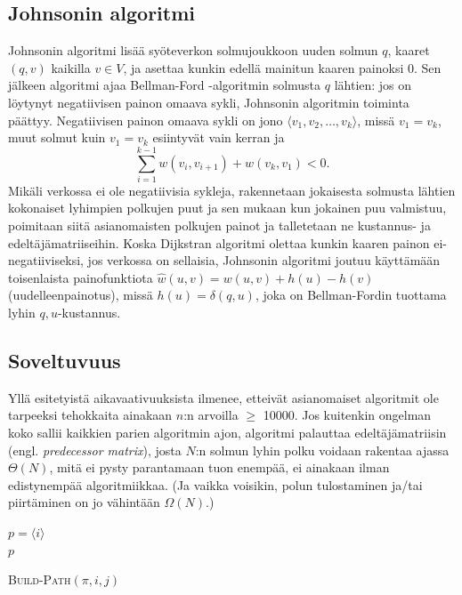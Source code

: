 \documentclass[finnish]{tktltiki2}
\newenvironment{finalgo}[1][htb]{
  \renewcommand{\algorithmcfname}{Algoritmi}
  \begin{algorithm}[#1]
}{\end{algorithm}}
\theoremstyle{definition}
\theoremstyle{remark}
\begin{document}
\subsection{Johnsonin algoritmi}
Johnsonin algoritmi lisää syöteverkon solmujoukkoon uuden solmun $q$, kaaret $(q, v)$ kaikilla $v \in V$, ja asettaa kunkin edellä mainitun kaaren painoksi 0. Sen jälkeen algoritmi ajaa Bellman-Ford -algoritmin solmusta $q$ lähtien: jos on löytynyt negatiivisen painon omaava sykli, Johnsonin algoritmin toiminta päättyy. 
Negatiivisen painon omaava sykli on jono $\langle v_1, v_2, \dots, v_k \rangle$, missä $v_1 = v_k$, muut solmut kuin $v_1 = v_k$ esiintyvät vain kerran ja 
\[
\sum_{i = 1}^{k - 1} w(v_i, v_{i +1}) + w(v_k, v_1) < 0.
\]
Mikäli verkossa ei ole negatiivisia sykleja, rakennetaan jokaisesta solmusta lähtien kokonaiset lyhimpien polkujen puut ja sen mukaan kun jokainen puu valmistuu, poimitaan siitä asianomaisten polkujen painot ja talletetaan ne kustannus- ja edeltäjämatriiseihin. Koska Dijkstran algoritmi olettaa kunkin kaaren painon ei-negatiiviseksi, jos verkossa on sellaisia, Johnsonin algoritmi joutuu käyttämään toisenlaista painofunktiota $\hat{w}(u, v) = w(u, v) + h(u) - h(v)$ (uudelleenpainotus), missä $h(u) = \delta(q, u)$, joka on Bellman-Fordin tuottama lyhin $q, u$-kustannus.

\subsection{Soveltuvuus}
Yllä esitetyistä aikavaativuuksista ilmenee, etteivät asianomaiset algoritmit ole tarpeeksi tehokkaita ainakaan $n$:n arvoilla $\geq$ 10000. Jos kuitenkin ongelman koko sallii kaikkien parien algoritmin ajon, algoritmi palauttaa edeltäjämatriisin (engl. \textit{predecessor matrix}), josta $N$:n solmun lyhin polku voidaan rakentaa ajassa $\Theta(N)$, mitä ei pysty parantamaan tuon enempää, ei ainakaan ilman edistynempää algoritmiikkaa. (Ja vaikka voisikin, polun tulostaminen ja/tai piirtäminen on jo vähintään $\Omega(N)$.)
\begin{finalgo}[t]
$p = \langle i \rangle$ \\
\KwRet $p$ \\
\label{alg:buildpath}
\caption{\textsc{Build-Path}$(\pi, i, j)$}
\end{finalgo}
\end{document}
